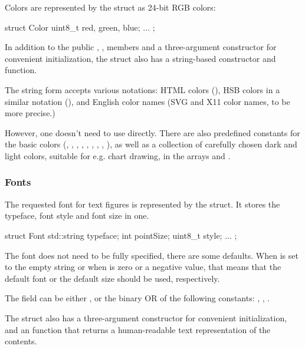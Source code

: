 Colors are represented by the  struct as 24-bit RGB colors:

\begin{cpp}
struct Color {
    uint8_t red, green, blue;
    ...
};
\end{cpp}

In addition to the public , ,  members
and a three-argument constructor for convenient initialization, the struct
also has a string-based constructor and  function.

The string form accepts various notations: HTML colors (),
HSB colors in a similar notation (), and English color names
(SVG and X11 color names, to be more precise.)

However, one doesn't need to use  directly.
There are also predefined constants for the basic colors (,
, , , , , ,
, ), as well as a collection of carefully chosen
dark and light colors, suitable for e.g. chart drawing, in the arrays
 and .


\subsubsection{Fonts}

The requested font for text figures is represented by the 
struct. It stores the typeface, font style and font size in one.

\begin{cpp}
struct Font {
    std::string typeface;
    int pointSize;
    uint8_t style;
    ...
};
\end{cpp}

The font does not need to be fully specified, there are some defaults. When
 is set to the empty string or when  is zero
or a negative value, that means that the default font or the default size
should be used, respectively.

The  field can be either , or the binary OR of
the following constants: , ,
.

The struct also has a three-argument constructor for convenient
initialization, and an  function that returns a human-readable
text representation of the contents.


